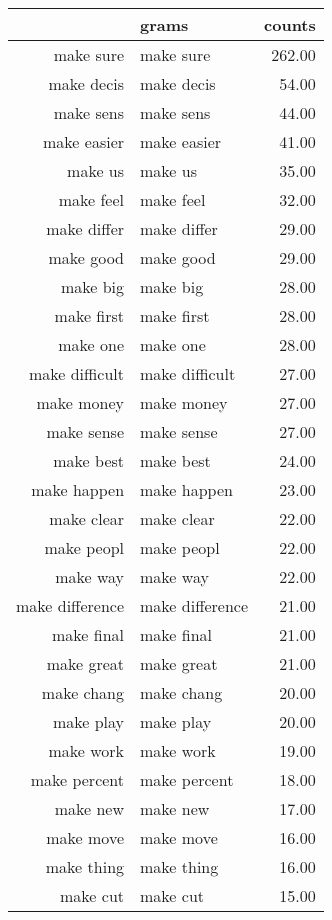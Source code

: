 \begin{table}[ht]
\centering
\begin{tabular}{rlr}
  \hline
 & grams & counts \\ 
  \hline
make sure & make sure & 262.00 \\ 
  make decis & make decis & 54.00 \\ 
  make sens & make sens & 44.00 \\ 
  make easier & make easier & 41.00 \\ 
  make us & make us & 35.00 \\ 
  make feel & make feel & 32.00 \\ 
  make differ & make differ & 29.00 \\ 
  make good & make good & 29.00 \\ 
  make big & make big & 28.00 \\ 
  make first & make first & 28.00 \\ 
  make one & make one & 28.00 \\ 
  make difficult & make difficult & 27.00 \\ 
  make money & make money & 27.00 \\ 
  make sense & make sense & 27.00 \\ 
  make best & make best & 24.00 \\ 
  make happen & make happen & 23.00 \\ 
  make clear & make clear & 22.00 \\ 
  make peopl & make peopl & 22.00 \\ 
  make way & make way & 22.00 \\ 
  make difference & make difference & 21.00 \\ 
  make final & make final & 21.00 \\ 
  make great & make great & 21.00 \\ 
  make chang & make chang & 20.00 \\ 
  make play & make play & 20.00 \\ 
  make work & make work & 19.00 \\ 
  make percent & make percent & 18.00 \\ 
  make new & make new & 17.00 \\ 
  make move & make move & 16.00 \\ 
  make thing & make thing & 16.00 \\ 
  make cut & make cut & 15.00 \\ 

\end{tabular}
\end{table}
